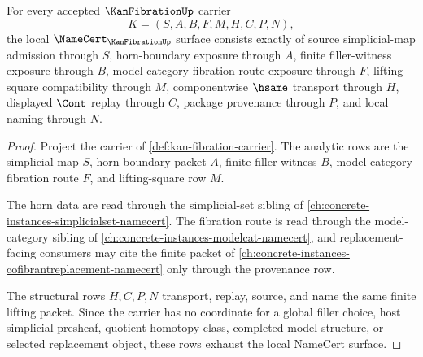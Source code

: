 \begin{theorem}
\label{thm:kan-fibration-namecert-obligations}
For every accepted $\KanFibrationUp$ carrier
$$
K=(S,A,B,F,M,H,C,P,N),
$$
the local $\NameCert_{\KanFibrationUp}$ surface consists exactly of source simplicial-map admission through $S$, horn-boundary exposure through $A$, finite filler-witness exposure through $B$, model-category fibration-route exposure through $F$, lifting-square compatibility through $M$, componentwise $\hsame$ transport through $H$, displayed $\Cont$ replay through $C$, package provenance through $P$, and local naming through $N$.
\end{theorem}
\begin{proof}
Project the carrier of \autoref{def:kan-fibration-carrier}. The analytic rows are the simplicial map $S$, horn-boundary packet $A$, finite filler witness $B$, model-category fibration route $F$, and lifting-square row $M$.

The horn data are read through the simplicial-set sibling of \autoref{ch:concrete-instances-simplicialset-namecert}. The fibration route is read through the model-category sibling of \autoref{ch:concrete-instances-modelcat-namecert}, and replacement-facing consumers may cite the finite packet of \autoref{ch:concrete-instances-cofibrantreplacement-namecert} only through the provenance row.

The structural rows $H,C,P,N$ transport, replay, source, and name the same finite lifting packet. Since the carrier has no coordinate for a global filler choice, host simplicial presheaf, quotient homotopy class, completed model structure, or selected replacement object, these rows exhaust the local NameCert surface.
\end{proof}

